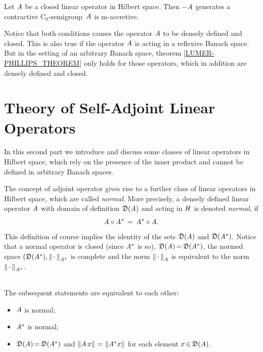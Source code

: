 \documentclass[11pt,twoside]{article}
\begin{document}
\begin{theorem}\label{LUMER-PHILLIPS_THEOREM}
Let $\mathit{A}$ be a closed linear operator in Hilbert space.
Then $-\mathit{A}$ generates a contractive C$_0$-semigroup
\iff
$\,\mathit{A}$ is m-accretive.
\end{theorem}

\subparagraph*{}
Notice that both conditions causes the operator $\mathit{A}$
to be densely defined and closed.
This is also true
if the operator $\mathit{A}$ is acting in a reflexive Banach space.
But in the setting of an arbitrary Banach space,
theorem \ref{LUMER-PHILLIPS_THEOREM} only holds for those operators,
which in addition are densely defined and closed.

\newpage
\thispagestyle{empty}

\part{Theory of Self-Adjoint Linear Operators}
In this second part we introduce and discuss some classes
of linear operators in Hilbert space,
which rely on the presence of the inner product and cannot be defined 
in arbitrary Banach spaces.

\subparagraph*{} %
The concept of adjoint operator gives rise to a further class
of linear operators in Hilbert space,
which are called \textit{normal}.
More precisely,
a densely defined linear operator $\mathit{A}$
with domain of definition $\mathfrak{D}(\mathit{A})$
and acting in $\mathit{H}$ is denoted \textit{normal},
if
\[
\mathit{A} \circ \mathit{A}^* \,=\, \mathit{A}^* \circ \mathit{A}.
\]
This definition of course implies the identity
of the sets $\mathfrak{D}(\mathit{A})$ and $\mathfrak{D}(\mathit{A}^*)$.
Notice that a normal operator is closed (since $\mathit{A}^*$ is so),
$\mathfrak{D}(\mathit{A}) {\,=\,} \mathfrak{D}(\mathit{A}^*)$,
the normed space $(\mathfrak{D}(\mathit{A}^*),\left\lVert \,\cdot\, \right\rVert_{\mathit{A}^*}$ is complete
and the norm $\left\lVert \,\cdot\, \right\rVert_{\mathit{A}}$ is equivalent to the norm
$\left\lVert \,\cdot\, \right\rVert_{\mathit{A}^*}$.

\paragraph*{}
The subsequent statements are equivalent to each other:
\begin{itemize}[leftmargin=9mm]
\item[1.] $\mathit{A}$ is normal;
\item[2.] $\mathit{A}^*$ is normal;
\item[3.] $\mathfrak{D}(\mathit{A}) {\,=\,} \mathfrak{D}(\mathit{A}^*)$ and
          $\left\lVert \mathit{A} \,x \right\rVert {\,=\,} \left\lVert \mathit{A}^* x \right\rVert$
          for each element $x {\,\in\,} \mathfrak{D}(\mathit{A})$.
\end{itemize}
\end{document}
